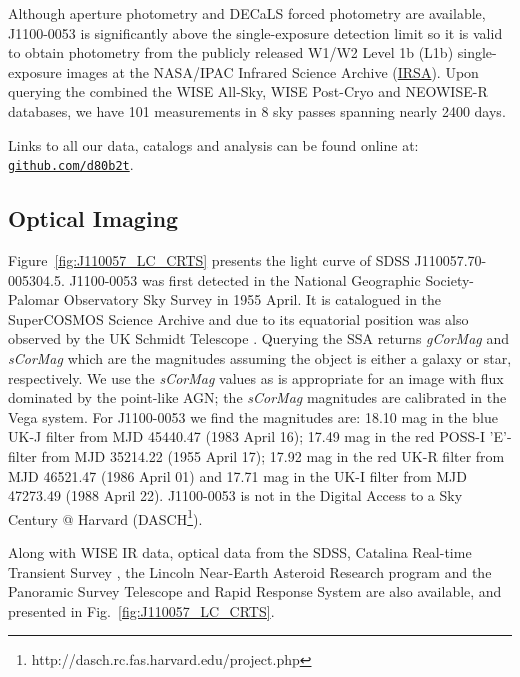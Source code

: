 \documentclass[a4paper,fleqn,usenatbib]{mnras}
\begin{document}
Although aperture photometry and DECaLS forced photometry
\citep{Lang2014, Meisner2017a, Meisner2017b} are available, J1100-0053
is significantly above the single-exposure detection limit so it is
valid to obtain photometry from the publicly released W1/W2 Level 1b
(L1b) single-exposure images at the NASA/IPAC Infrared Science Archive
(\href{http://irsa.ipac.caltech.edu/}{IRSA}).  Upon querying the
combined the WISE All-Sky, WISE Post-Cryo and NEOWISE-R databases, we
have 101 measurements in 8 sky passes spanning nearly 2400 days.

Links to all our data, catalogs and analysis can be found
online at: \href{https://github.com/d80b2t}{{\tt github.com/d80b2t}}.


\subsection{Optical Imaging}
Figure~\ref{fig:J110057_LC_CRTS} presents the light curve of SDSS J110057.70-005304.5.  J1100-0053 was first detected in the National Geographic Society-Palomar Observatory Sky Survey \cite[NGS-POSS; ][]{Abell1959, Minkowski_Abell1963book} in 1955 April. It is catalogued in the SuperCOSMOS Science Archive \citep[\href{http://ssa.roe.ac.uk/}{SSA}; ][]{Hambly2001_I, Hambly2001_II} and due to its equatorial position was also observed by the UK Schmidt Telescope \cite[UKST; ][]{Cannon1975, Cannon1979book}. Querying the SSA returns {\it gCorMag} and {\it sCorMag} which are the magnitudes assuming the object is either a galaxy or star, respectively. We use the {\it sCorMag} values as is appropriate for an image with flux dominated by the point-like AGN; the {\it sCorMag} magnitudes are calibrated in the Vega system. For J1100-0053 we find the magnitudes are: 18.10 mag in the blue UK-J filter from MJD 45440.47 (1983 April 16); 17.49 mag in the red POSS-I 'E'-filter from MJD 35214.22 (1955 April 17); 17.92 mag in the red UK-R filter from MJD 46521.47 (1986 April 01) and 17.71 mag in the UK-I filter from MJD 47273.49 (1988 April 22). J1100-0053 is not in the Digital Access to a Sky Century @ Harvard (DASCH\footnote{http://dasch.rc.fas.harvard.edu/project.php}).

Along with WISE IR data, optical data from the SDSS, Catalina Real-time Transient Survey \citep[CRTS;][]{Drake2009, Mahabal2011}, the Lincoln Near-Earth Asteroid Research \citep[LINEAR; ][]{Sesar2011} program and the Panoramic Survey Telescope and Rapid Response System \citep[PanSTARRS;][]{Kaiser2010, Stubbs2010, Tonry2012, Magnier2013} are also available, and presented in Fig.~\ref{fig:J110057_LC_CRTS}.
\end{document}
